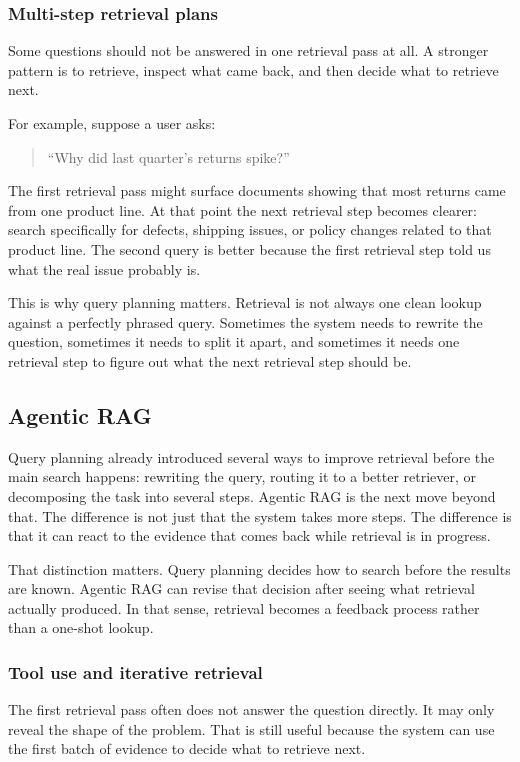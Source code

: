 \documentclass[12pt]{article}
\begin{document}
\subsubsection{Multi-step retrieval plans}

Some questions should not be answered in one retrieval pass at all. A
stronger pattern is to retrieve, inspect what came back, and then decide
what to retrieve next.

For example, suppose a user asks:
\begin{quote}
``Why did last quarter's returns spike?''
\end{quote}
The first retrieval pass might surface documents showing that most returns
came from one product line. At that point the next retrieval step becomes
clearer: search specifically for defects, shipping issues, or policy
changes related to that product line. The second query is better because
the first retrieval step told us what the real issue probably is.

This is why query planning matters. Retrieval is not always one clean
lookup against a perfectly phrased query. Sometimes the system needs to
rewrite the question, sometimes it needs to split it apart, and sometimes
it needs one retrieval step to figure out what the next retrieval step
should be.

\subsection{Agentic RAG}

Query planning already introduced several ways to improve retrieval before
the main search happens: rewriting the query, routing it to a better
retriever, or decomposing the task into several steps. Agentic RAG is the
next move beyond that. The difference is not just that the system takes
more steps. The difference is that it can react to the evidence that comes
back while retrieval is in progress.

That distinction matters. Query planning decides how to search before the
results are known. Agentic RAG can revise that decision after seeing what
retrieval actually produced. In that sense, retrieval becomes a feedback
process rather than a one-shot lookup.

\subsubsection{Tool use and iterative retrieval}

The first retrieval pass often does not answer the question directly. It
may only reveal the shape of the problem. That is still useful because the
system can use the first batch of evidence to decide what to retrieve next.
\end{document}
